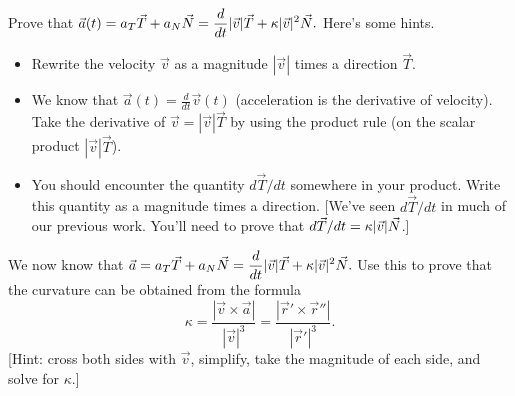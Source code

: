 \begin{problem}%
 Prove that $\displaystyle \vec a(t) = a_T\vec T+a_N\vec N=\frac{d}{dt}|\vec v| \vec T + \kappa |\vec v|^2 \vec N.$ Here's some hints.
\begin{itemize}
 \item Rewrite the velocity $\vec v$ as a magnitude $|\vec v|$ times a direction $\vec T$.  
 \item We know that $\vec a(t) = \frac{d}{dt}\vec v(t)$ (acceleration is the derivative of velocity). Take the derivative of $\vec v = |\vec v|\vec T$ by using the product rule (on the scalar product $|\vec v|\vec T$).
 \item You should encounter the quantity $d\vec T/dt$ somewhere in your product. Write this quantity as a magnitude times a direction. [We've seen $d\vec T/dt$ in much of our previous work. You'll need to prove that $\displaystyle d\vec T/dt=\kappa|\vec v|\vec N$.]
\end{itemize}
\end{problem}

\begin{problem}
We now know that $\displaystyle \vec a = a_T\vec T+a_N\vec N=\frac{d}{dt}|\vec v| \vec T + \kappa |\vec v|^2 \vec N.$  
Use this to prove that the curvature can be obtained from the formula $$\kappa = \frac{|\vec v\times \vec a|}{|\vec v|^3} = \frac{|\vec r'\times \vec r''|}{|\vec r'|^3}.$$ [Hint: cross both sides with $\vec v$, simplify, take the magnitude of each side, and solve for $\kappa$.]
\end{problem}



